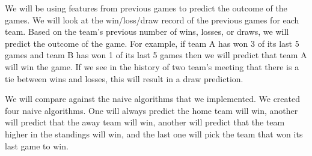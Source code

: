 \documentclass[conference]{IEEEtran}
\begin{document}
We will be using features from previous games to predict the outcome of the games. We will look at the win/loss/draw record of the previous games for each team. Based on the team’s previous number of wins, losses, or draws, we will predict the outcome of the game. For example, if team A has won 3 of its last 5 games and team B has won 1 of its last 5 games then we will predict that team A will win the game. If we see in the history of two team’s meeting that there is a tie between wins and losses, this will result in a draw prediction.

We will compare against the naive algorithms that we implemented. We created four naive algorithms. One will always predict the home team will win, another will predict that the away team will win, another will predict that the team higher in the standings will win, and the last one will pick the team that won its last game to win.
\nocite{*}


\clearpage


\end{document}
